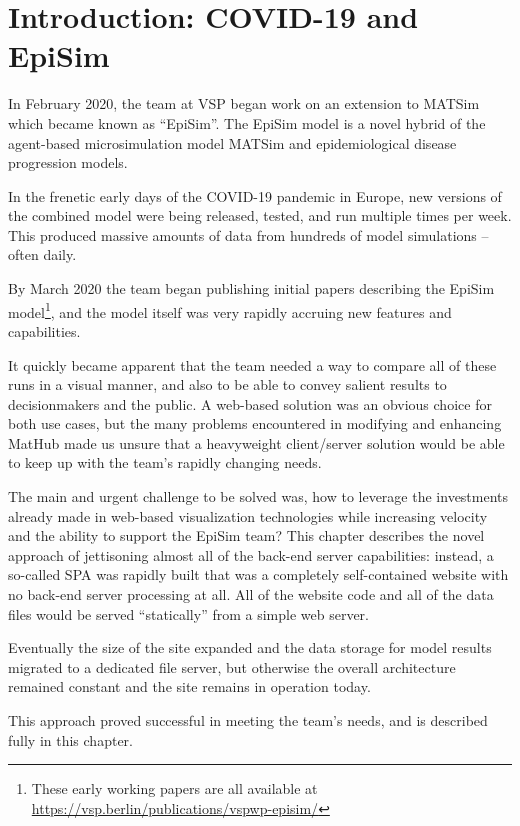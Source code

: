 \hypertarget{covid-introduction-covid-19-and-episim}{%
\section{Introduction: COVID-19 and EpiSim}\label{introduction-covid-19-and-episim}}

In February 2020, the team at VSP began work on an extension to MATSim which became known as ``EpiSim''. The EpiSim model is a novel hybrid of the agent-based microsimulation model MATSim and epidemiological disease progression models.

In the frenetic early days of the COVID-19 pandemic in Europe, new versions of the combined model were being released, tested, and run multiple times per week. This produced massive amounts of data from hundreds of model simulations -- often daily.

By March 2020 the team began publishing initial papers describing the EpiSim model\footnote{These early working papers are all available at \url{https://vsp.berlin/publications/vspwp-episim/}}, and the model itself was very rapidly accruing new features and capabilities.

It quickly became apparent that the team needed a way to compare all of these runs in a visual manner, and also to be able to convey salient results to decisionmakers and the public. A web-based solution was an obvious choice for both use cases, but the many problems encountered in modifying and enhancing MatHub made us unsure that a heavyweight client/server solution would be able to keep up with the team's rapidly changing needs.

The main and urgent challenge to be solved was, how to leverage the investments already made in web-based visualization technologies while increasing velocity and the ability to support the EpiSim team? This chapter describes the novel approach of jettisoning almost all of the back-end server capabilities: instead, a so-called \gls{SPA} was rapidly built that was a completely self-contained website with no back-end server processing at all. All of the website code and all of the data files would be served ``statically'' from a simple web server.

Eventually the size of the site expanded and the data storage for model results migrated to a dedicated file server, but otherwise the overall architecture remained constant and the site remains in operation today.

This approach proved successful in meeting the team's needs, and is described fully in this chapter.

